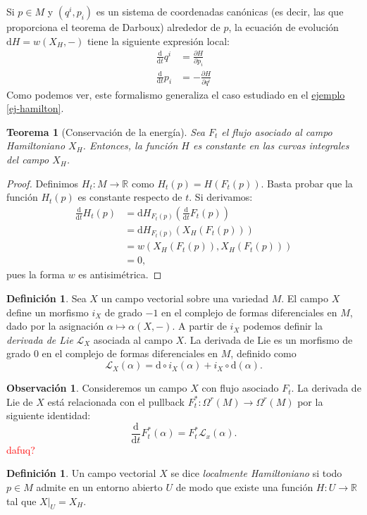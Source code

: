\documentclass[11pt, a4paper]{article}
\newcommand{\RR}{\mathbb{R}}
\newcommand{\LL}{\mathcal{L}}
\newcommand{\dd}{\mathrm{d}}
\newcommand{\ddt}{\frac{\dd}{\dd t}}
\theoremstyle{plain}
\newtheorem{thm}[prop]{Teorema}
\theoremstyle{definition}
\newtheorem{defn}[prop]{Definición}
\newtheorem{obs}[prop]{Observación}
\begin{document}
Si $p\in M$ y $(q^i,p_i)$ es un sistema de coordenadas canónicas (es decir, las que proporciona el teorema de Darboux) alrededor de $p$, la ecuación de evolución $\dd H = w(X_H, -)$ tiene la siguiente expresión local:
\begin{align*}
\ddt q^i &= \frac{\partial H}{\partial p_i}\\
\ddt p_i &= -\frac{\partial H}{\partial q^i}
\end{align*}
Como podemos ver, este formalismo generaliza el caso estudiado en el \hyperref[ej-hamilton]{ejemplo \ref*{ej-hamilton}}.

\begin{thm}[Conservación de la energía] Sea $F_t$ el flujo asociado al campo Hamiltoniano $X_H$. Entonces, la función $H$ es constante en las curvas integrales del campo $X_H$.
\end{thm}
\begin{proof} Definimos $H_t:M\to \RR$ como $H_t(p)=H(F_t(p))$. Basta probar que la función $H_t(p)$ es constante respecto de $t$. Si derivamos:
\begin{align*}\ddt  H_t(p)&=\dd H_{F_t(p)}\left(\ddt  F_t(p)\right)\\
&=\dd H_{F_t(p)}\left(X_H(F_t(p))\right)\\
&= w\left(X_H(F_t(p)), X_H(F_t(p))\right)\\
&= 0,
\end{align*}
pues la forma $w$ es antisimétrica.
\end{proof}
\begin{defn} Sea $X$ un campo vectorial sobre una variedad $M$. El campo $X$ define un morfismo $i_X$ de grado $-1$ en el complejo de formas diferenciales en $M$, dado por la asignación $\alpha\mapsto \alpha(X,-)$. A partir de $i_X$ podemos definir la \emph{derivada de Lie} $\LL_X$ asociada al campo $X$. La derivada de Lie es un morfismo de grado $0$ en el complejo de formas diferenciales en $M$, definido como
\[\LL_X(\alpha) = \dd \circ i_X(\alpha) + i_X\circ\dd (\alpha).\]
\end{defn}
\begin{obs} Consideremos un campo $X$ con flujo asociado $F_t$. La derivada de Lie de $X$ está relacionada con el pullback $F_t^*:\Omega^r(M)\to\Omega^r(M)$ por la siguiente identidad:
\begin{equation}
\label{der-lie}
\ddt  F_t^*(\alpha) = F_t^*\LL_x(\alpha).
\end{equation}
\textcolor{red}{dafuq?}
\end{obs}
\begin{defn} Un campo vectorial $X$ se dice \emph{localmente Hamiltoniano} si todo $p\in M$ admite en un entorno abierto $U$ de modo que existe una función $H:U\to \RR$ tal que $X|_U = X_H$.
\end{defn}
\end{document}
